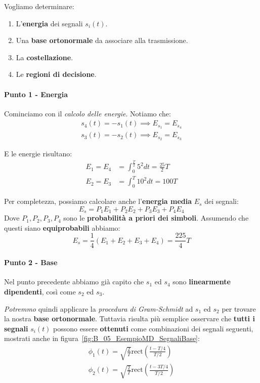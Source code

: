 \begin{exa}[ESERCIZIO]
    Vogliamo determinare:
    \begin{enumerate}
        \item L'\textbf{energia} dei segnali $s_i(t)$.
        \item Una \textbf{base ortonormale} da associare alla trasmissione.
        \item La \textbf{costellazione}.
        \item Le \textbf{regioni di decisione}.
    \end{enumerate}
\end{exa}

\paragraph{Punto 1 - Energia}
Cominciamo con il \textit{calcolo delle energie}. Notiamo che:
\[
    \begin{aligned}
        s_{4}(t) = -s_{1}(t) \implies E_{s_{1}} = E_{s_{4}} \\
        s_{3}(t) = -s_{2}(t) \implies E_{s_{2}} = E_{s_{3}} 
    \end{aligned}
\]

E le energie risultano:
\[
    \begin{aligned}
        E_{1} = E_{4} &= \int_{0}^{\frac{T}{2}} 5^2 dt = \frac{25}{2}T \\
        E_{2} = E_{3} &= \int_{0}^{T} 10^2 dt = 100T
    \end{aligned}
\]

Per completezza, possiamo calcolare anche l'\textbf{energia media} $E_s$ dei segnali:
\[
    E_s = P_{1} E_{1} + P_{2} E_{2} + P_{3} E_{3} + P_{4} E_{4}
\]
Dove $P_{1},P_{2},P_{3},P_{4}$ sono le \textbf{probabilità a priori dei simboli}.
Assumendo che questi siano \textbf{equiprobabili} abbiamo:
\[
    E_s = \frac{1}{4} (E_{1} + E_{2} + E_{3} + E_{4}) = \frac{225}{4}T
\]

\paragraph{Punto 2 - Base}
Nel punto precedente abbiamo già capito che $s_{1}$ ed $s_{4}$ sono \textbf{linearmente dipendenti},
così come $s_{2}$ ed $s_{3}$.

\textit{Potremmo} quindi applicare la \textit{procedura di Gram-Schmidt} ad $s_{1}$ ed $s_{2}$
per trovare la nostra \textbf{base ortonormale}. Tuttavia risulta più semplice osservare
che \textbf{tutti i segnali} $s_i(t)$ possono essere \textbf{ottenuti} come
combinazioni dei segnali seguenti, mostrati anche in figura~\ref{fig:B_05_EsempioMD_SegnaliBase}:
\[
    \begin{aligned}
        \phi_{1}(t) = \sqrt{\frac{2}{T}} \text{rect} \left( \frac{t - T /4}{T/2} \right) \\
        \phi_{2}(t) = \sqrt{\frac{2}{T}} \text{rect} \left( \frac{t - 3T /4}{T/2} \right) 
    \end{aligned}
\]

